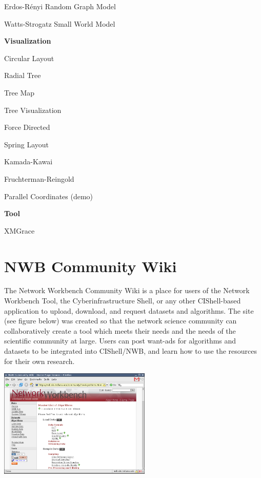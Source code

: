 \begin{multicols}{2}
{\begin{tiny}
\begin{list}{}{\setlength{\itemindent}{-7mm}\setlength{\itemsep}{0mm}\setlength{\topsep}{1mm}}
\item Erdos-R\'{e}nyi Random Graph Model
\item Watts-Strogatz Small World Model
\end{list}
\textbf{Visualization}
\begin{list}{}{\setlength{\itemindent}{-7mm}\setlength{\itemsep}{0mm}\setlength{\topsep}{1mm}}
\item Circular Layout
\item Radial Tree
\item Tree Map
\item Tree Visualization
\item Force Directed
\item Spring Layout
\item Kamada-Kawai
\item Fruchterman-Reingold
\item Parallel Coordinates (demo)
\end{list}
\textbf{Tool}
\begin{list}{}{\setlength{\itemindent}{-7mm}\setlength{\itemsep}{0mm}\setlength{\topsep}{1mm}}
\item XMGrace
\item 
\item 
\end{list}
\end{tiny}
}
\end{multicols}



\section{NWB Community Wiki}

The Network Workbench Community Wiki \cite{nwbCommunityWiki} is a place for 
users of the Network Workbench Tool, the Cyberinfrastructure Shell, or any 
other CIShell-based application to upload, download, and request datasets and
algorithms. The site (see figure below) was created so that the network science 
community can collaboratively create a tool which meets their needs and the 
needs of the scientific community at large. Users can post want-ads for 
algorithms and datasets to be integrated into CIShell/NWB, and learn how to use 
the resources for their own research.

\begin{center}
\includegraphics[width=2.85in]{nwb-graphics/nwbWiki.png}
\end{center}